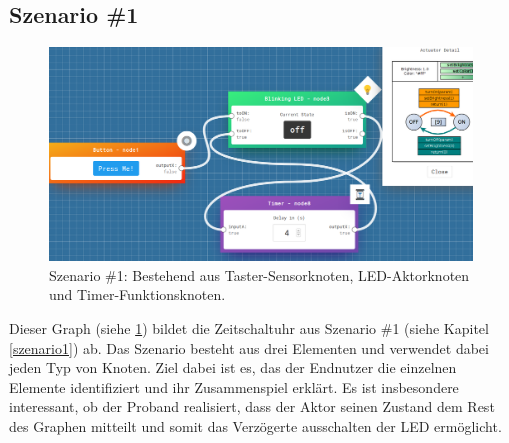 \subsection{Szenario \#1}\label{anhang:szenario1}
\begin{figure}[H]
    \centering
    \includegraphics[width=1\textwidth]{bilder/Anhang/timerclock_cut.png}
    \caption{Szenario \#1: Bestehend aus Taster-Sensorknoten, LED-Aktorknoten und Timer-Funktionsknoten.}
    \label{fig:szenario1}
\end{figure}
Dieser Graph (siehe \ref{fig:szenario1}) bildet die Zeitschaltuhr aus Szenario \#1 (siehe Kapitel \ref{szenario1}) ab. Das Szenario besteht aus drei Elementen und verwendet dabei jeden Typ von Knoten. 
Ziel dabei ist es, das der Endnutzer die einzelnen Elemente identifiziert und ihr Zusammenspiel erklärt. Es ist insbesondere interessant, ob der Proband realisiert, dass der Aktor seinen Zustand dem Rest des Graphen mitteilt und somit das Verzögerte ausschalten der LED ermöglicht.

